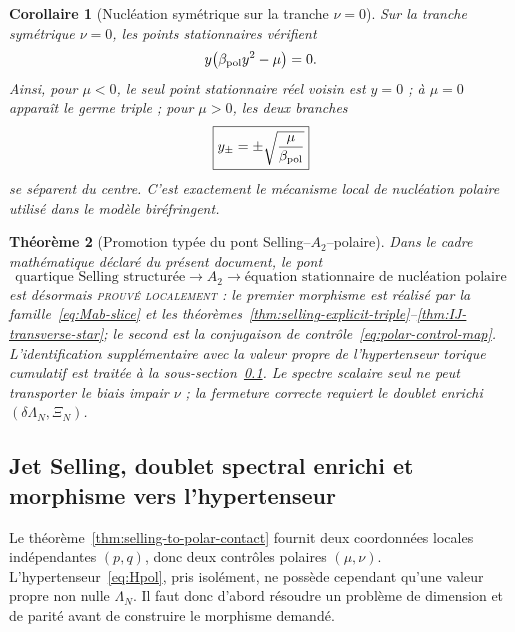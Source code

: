 \documentclass[11pt,a4paper]{article}
\newtheorem{theorem}{Théorème}[section]
\newtheorem{corollary}[theorem]{Corollaire}
\begin{document}
\begin{corollary}[Nucléation symétrique sur la tranche $\nu=0$]\label{cor:selling-polar-nucleation}
Sur la tranche symétrique $\nu=0$, les points stationnaires vérifient
\[
 y\bigl(\beta_{\rm pol}y^2-\mu\bigr)=0.
\]
Ainsi, pour $\mu<0$, le seul point stationnaire réel voisin est $y=0$ ; à $\mu=0$ apparaît le germe triple ; pour $\mu>0$, les deux branches
\begin{equation}\label{eq:polar-branches-promoted}
 \boxed{y_\pm=\pm\sqrt{\frac{\mu}{\beta_{\rm pol}}}}
\end{equation}
se séparent du centre. C'est exactement le mécanisme local de nucléation polaire utilisé dans le modèle biréfringent.
\end{corollary}

\begin{theorem}[Promotion typée du pont Selling--$A_2$--polaire]\label{thm:promotion-status-v5}
Dans le cadre mathématique déclaré du présent document, le pont
\[
 \boxed{
 \text{quartique Selling structurée}\longrightarrow A_2
 \longrightarrow\text{équation stationnaire de nucléation polaire}}
\]
est désormais \textsc{prouvé localement} : le premier morphisme est réalisé par la famille~\eqref{eq:Mab-slice} et les théorèmes~\ref{thm:selling-explicit-triple}--\ref{thm:IJ-transverse-star}; le second est la conjugaison de contrôle~\eqref{eq:polar-control-map}. L'identification supplémentaire avec la valeur propre de l'hypertenseur torique cumulatif est traitée à la sous-section~\ref{subsec:selling-hypertensor-morphism}. Le spectre scalaire seul ne peut transporter le biais impair $\nu$ ; la fermeture correcte requiert le doublet enrichi $(\delta\Lambda_N,\Xi_N)$.
\end{theorem}


\subsection{Jet Selling, doublet spectral enrichi et morphisme vers l'hypertenseur}\label{subsec:selling-hypertensor-morphism}

Le théorème~\ref{thm:selling-to-polar-contact} fournit deux coordonnées locales indépendantes $(p,q)$, donc deux contrôles polaires $(\mu,\nu)$. L'hypertenseur~\eqref{eq:Hpol}, pris isolément, ne possède cependant qu'une valeur propre non nulle $\Lambda_N$. Il faut donc d'abord résoudre un problème de dimension et de parité avant de construire le morphisme demandé.
\end{document}
